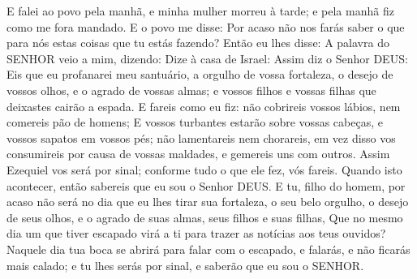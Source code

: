 {  E falei ao povo pela manhã, e minha mulher morreu à tarde; e pela manhã fiz como me fora mandado.
  E o povo me disse: Por acaso não nos farás saber o que
{} para nós estas coisas que tu estás fazendo?
  Então eu lhes disse: A palavra do SENHOR veio a mim, dizendo:
  Dize à casa de Israel: Assim diz o Senhor DEUS: Eis que eu profanarei meu santuário, a orgulho de vossa fortaleza, o desejo de vossos olhos, e o agrado de vossas almas; e vossos filhos e vossas filhas que deixastes cairão a espada.
  E fareis como eu fiz: não cobrireis vossos lábios, nem comereis pão de homens;
  E vossos turbantes estarão sobre vossas cabeças, e vossos sapatos em vossos pés; não lamentareis nem chorareis, em vez disso vos consumireis por causa de vossas maldades, e gemereis uns com outros.
  Assim Ezequiel vos será por sinal; conforme tudo o que ele fez, vós fareis. Quando isto acontecer, então sabereis que eu sou o Senhor DEUS.
  E tu, filho do homem, por acaso não será no dia que eu lhes tirar sua fortaleza, o seu belo orgulho, o desejo de seus olhos, e o agrado de suas almas, seus filhos e suas filhas,
  Que no mesmo dia um que tiver escapado virá a ti para trazer as notícias aos teus ouvidos?
  Naquele dia tua boca se abrirá para falar com o escapado, e falarás, e não ficarás mais calado; e tu lhes serás por sinal, e saberão que eu sou o SENHOR.
\par }

